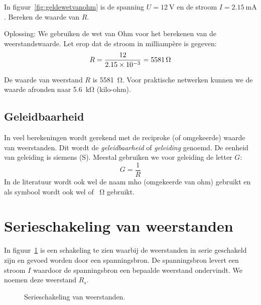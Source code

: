 \begin{example}
In figuur~\ref{fig:geldewetvanohm} is de spanning $U=\SI{12}{\volt}$ en de stroom $I=\SI{2.15}{\milli\ampere}$.
Bereken de waarde van $R$.

Oplossing: We gebruiken de wet van Ohm voor het berekenen van de weerstandswaarde. Let erop dat de stroom in milliampère is gegeven:
\begin{equation}
R = \dfrac{12}{\num{2.15d-3}} = \SI{5581}{\ohm} 
\end{equation}

De waarde van weerstand $R$ is \SI{5581}{\ohm}. Voor praktische netwerken kunnen we de waarde afronden
naar \SI{5.6}{\kilo\ohm} (kilo-ohm).
\end{example}

\subsection{Geleidbaarheid}
In veel berekeningen wordt gerekend met de reciproke (of omgekeerde) waarde van weerstanden. Dit wordt
de \textsl{geleidbaarheid} of \textsl{geleiding} genoemd. De eenheid van geleiding is siemens (\si{\siemens}).
Meestal gebruiken we voor geleiding de letter $G$:
\begin{equation}
G = \dfrac{1}{R}
\end{equation}
In de literatuur wordt ook wel de naam mho (omgekeerde van ohm) gebruikt en als symbool wordt ook wel \si{\mho}
of \si{\per\ohm} gebruikt.


\section{Serieschakeling van weerstanden}
In figuur~\ref{fig:gelserieschakelingweerstanden} is een schakeling te zien waarbij de weerstanden
in serie geschakeld zijn en gevoed worden door een spanningsbron. De spanningsbron levert een stroom
$I$ waardoor de spanningsbron een bepaalde weerstand ondervindt. We noemen deze weerstand $R_s$.

\begin{figure}[!ht]
\centering
{}
\caption{Serieschakeling van weerstanden.}
\label{fig:gelserieschakelingweerstanden}
\end{figure}

